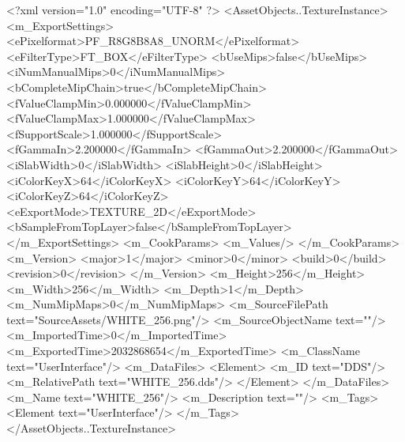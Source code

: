 <?xml version="1.0" encoding="UTF-8" ?>
<AssetObjects..TextureInstance>
	<m_ExportSettings>
		<ePixelformat>PF_R8G8B8A8_UNORM</ePixelformat>
		<eFilterType>FT_BOX</eFilterType>
		<bUseMips>false</bUseMips>
		<iNumManualMips>0</iNumManualMips>
		<bCompleteMipChain>true</bCompleteMipChain>
		<fValueClampMin>0.000000</fValueClampMin>
		<fValueClampMax>1.000000</fValueClampMax>
		<fSupportScale>1.000000</fSupportScale>
		<fGammaIn>2.200000</fGammaIn>
		<fGammaOut>2.200000</fGammaOut>
		<iSlabWidth>0</iSlabWidth>
		<iSlabHeight>0</iSlabHeight>
		<iColorKeyX>64</iColorKeyX>
		<iColorKeyY>64</iColorKeyY>
		<iColorKeyZ>64</iColorKeyZ>
		<eExportMode>TEXTURE_2D</eExportMode>
		<bSampleFromTopLayer>false</bSampleFromTopLayer>
	</m_ExportSettings>
	<m_CookParams>
		<m_Values/>
	</m_CookParams>
	<m_Version>
		<major>1</major>
		<minor>0</minor>
		<build>0</build>
		<revision>0</revision>
	</m_Version>
	<m_Height>256</m_Height>
	<m_Width>256</m_Width>
	<m_Depth>1</m_Depth>
	<m_NumMipMaps>0</m_NumMipMaps>
	<m_SourceFilePath text="SourceAssets/WHITE_256.png"/>
	<m_SourceObjectName text=""/>
	<m_ImportedTime>0</m_ImportedTime>
	<m_ExportedTime>2032868654</m_ExportedTime>
	<m_ClassName text="UserInterface"/>
	<m_DataFiles>
		<Element>
			<m_ID text="DDS"/>
			<m_RelativePath text="WHITE_256.dds"/>
		</Element>
	</m_DataFiles>
	<m_Name text="WHITE_256"/>
	<m_Description text=""/>
	<m_Tags>
		<Element text="UserInterface"/>
	</m_Tags>
</AssetObjects..TextureInstance>

